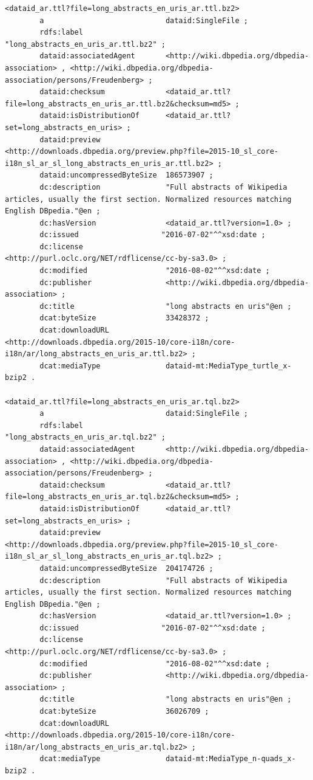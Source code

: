 \documentclass[a4paper,english,twoside,BCOR1.5cm,headsepline,DIV12,appendixprefix,final,12pt]{scrbook}
\begin{document}
\begin{lstlisting}[language=ttl, captionpos=b, label=lst:dcex,linewidth=\columnwidth,breaklines=true,basicstyle=\ttfamily\scriptsize]
<dataid_ar.ttl?file=long_abstracts_en_uris_ar.ttl.bz2>
        a                            dataid:SingleFile ;
        rdfs:label                   "long_abstracts_en_uris_ar.ttl.bz2" ;
        dataid:associatedAgent       <http://wiki.dbpedia.org/dbpedia-association> , <http://wiki.dbpedia.org/dbpedia-association/persons/Freudenberg> ;
        dataid:checksum              <dataid_ar.ttl?file=long_abstracts_en_uris_ar.ttl.bz2&checksum=md5> ;
        dataid:isDistributionOf      <dataid_ar.ttl?set=long_abstracts_en_uris> ;
        dataid:preview               <http://downloads.dbpedia.org/preview.php?file=2015-10_sl_core-i18n_sl_ar_sl_long_abstracts_en_uris_ar.ttl.bz2> ;
        dataid:uncompressedByteSize  186573907 ;
        dc:description               "Full abstracts of Wikipedia articles, usually the first section. Normalized resources matching English DBpedia."@en ;
        dc:hasVersion                <dataid_ar.ttl?version=1.0> ;
        dc:issued                   "2016-07-02"^^xsd:date ;
        dc:license                   <http://purl.oclc.org/NET/rdflicense/cc-by-sa3.0> ;
        dc:modified                  "2016-08-02"^^xsd:date ;
        dc:publisher                 <http://wiki.dbpedia.org/dbpedia-association> ;
        dc:title                     "long abstracts en uris"@en ;
        dcat:byteSize                33428372 ;
        dcat:downloadURL             <http://downloads.dbpedia.org/2015-10/core-i18n/core-i18n/ar/long_abstracts_en_uris_ar.ttl.bz2> ;
        dcat:mediaType               dataid-mt:MediaType_turtle_x-bzip2 .
        
<dataid_ar.ttl?file=long_abstracts_en_uris_ar.tql.bz2>
        a                            dataid:SingleFile ;
        rdfs:label                   "long_abstracts_en_uris_ar.tql.bz2" ;
        dataid:associatedAgent       <http://wiki.dbpedia.org/dbpedia-association> , <http://wiki.dbpedia.org/dbpedia-association/persons/Freudenberg> ;
        dataid:checksum              <dataid_ar.ttl?file=long_abstracts_en_uris_ar.tql.bz2&checksum=md5> ;
        dataid:isDistributionOf      <dataid_ar.ttl?set=long_abstracts_en_uris> ;
        dataid:preview               <http://downloads.dbpedia.org/preview.php?file=2015-10_sl_core-i18n_sl_ar_sl_long_abstracts_en_uris_ar.tql.bz2> ;
        dataid:uncompressedByteSize  204174726 ;
        dc:description               "Full abstracts of Wikipedia articles, usually the first section. Normalized resources matching English DBpedia."@en ;
        dc:hasVersion                <dataid_ar.ttl?version=1.0> ;
        dc:issued                   "2016-07-02"^^xsd:date ;
        dc:license                   <http://purl.oclc.org/NET/rdflicense/cc-by-sa3.0> ;
        dc:modified                  "2016-08-02"^^xsd:date ;
        dc:publisher                 <http://wiki.dbpedia.org/dbpedia-association> ;
        dc:title                     "long abstracts en uris"@en ;
        dcat:byteSize                36026709 ;
        dcat:downloadURL             <http://downloads.dbpedia.org/2015-10/core-i18n/core-i18n/ar/long_abstracts_en_uris_ar.tql.bz2> ;
        dcat:mediaType               dataid-mt:MediaType_n-quads_x-bzip2 .
        

\end{lstlisting}
\end{document}
